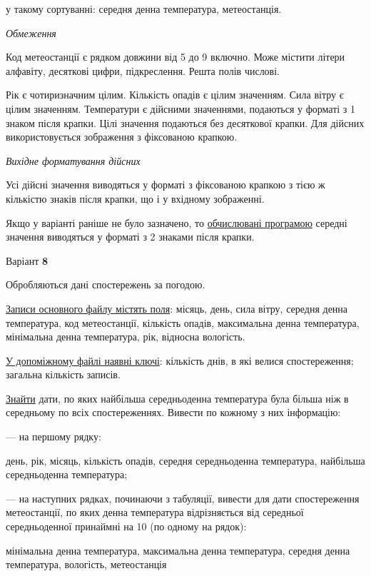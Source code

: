 \documentclass[11pt, ukrainian]{article}
\begin{document}
{\noindent}у такому сортуванні: середня денна температура, метеостанція.


\bigskip\textit{Обмеження}

Код метеостанції є рядком довжини від 5 до 9 включно.
Може містити літери алфавіту, десяткові цифри, підкреслення. Решта полів числові.

Рік є чотиризначним цілим.
Кількість опадів є цілим значенням.
Сила вітру є цілим значенням.
Температури є дійсними значеннями, подаються у форматі з 1 знаком після крапки.
Цілі значення подаються без десяткової крапки.
Для дійсних використовується зображення з фіксованою крапкою.

\textit{Вихідне форматування дійсних}

Усі дійсні значення виводяться у форматі з фіксованою крапкою з тією ж кількістю знаків після крапки, що і у вхідному зображенні.

Якщо у варіанті раніше не було зазначено, то \underline{обчислювані програмою} середні значення виводяться у форматі з 2 знаками після крапки.


\par
\newpage
{\center Варіант  \No \textbf { 8 }\par}
\bigskip
Обробляються дані спостережень за погодою. 

\underline{Записи основного файлу містять поля}: місяць, день, сила вітру, середня денна температура, код метеостанції, кількість опадів, максимальна денна температура, мінімальна денна температура, рік, відносна вологість.

\underline{У допоміжному файлі наявні ключі}: кількість днів, в які велися спостереження; загальна кількість записів.

\underline{Знайти} дати, по яких найбільша середньоденна температура була більша ніж в середньому по всіх спостереженнях. Вивести по кожному з них інформацію:\par
{\noindent}--- на першому рядку:\par
день, рік, місяць, кількість опадів, середня середньоденна температура, найбільша середньоденна температура;

{\noindent}--- на наступних рядках, починаючи з табуляції, вивести для дати спостереження метеостанції, по яких денна температура відрізняється від середньої середньоденної принаймні на 10 (по одному на рядок):\par
мінімальна денна температура, максимальна денна температура, середня денна температура, вологість, метеостанція
\end{document}
